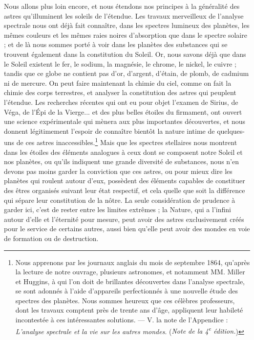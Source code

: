 \documentclass[a4paper, 11pt, oneside]{article}
\begin{document}
Nous allons plus loin encore, et nous étendons nos principes à la généralité des astres qu'illuminent les soleils de l'étendue. Les travaux merveilleux de l'analyse spectrale nous ont déjà fait connaître, dans les spectres lumineux des planètes, les mêmes couleurs et les mêmes raies noires d'absorption que dans le spectre solaire ; et de là nous sommes porté à voir dans les planètes des substances qui se trouvent également dans la constitution du Soleil. Or, nous savons déjà que dans le Soleil existent le fer, le sodium, la magnésie, le chrome, le nickel, le cuivre ; tandis que ce globe ne contient pas d'or, d'argent, d'étain, de plomb, de cadmium ni de mercure. On peut faire maintenant la chimie du ciel, comme on fait la chimie des corps terrestres, et analyser la constitution des astres qui peuplent l'étendue. Les recherches récentes qui ont eu pour objet l'examen de Sirius, de Véga, de l'Épi de la Vierge... et des plus belles étoiles du firmament, ont ouvert une science expérimentale qui mènera aux plus importantes découvertes, et nous donnent légitimement l'espoir de connaître bientôt la nature intime de quelques-uns de ces astres inaccessibles.\footnote{Nous apprenons par les journaux anglais du mois de septembre 1864, qu'après la lecture de notre ouvrage, plusieurs astronomes, et notamment MM. Miller et Huggins, à qui l'on doit de brillantes découvertes dans l'analyse spectrale, se sont adonnés à l'aide d'appareils perfectionnés à une nouvelle étude des spectres des planètes. Nous sommes heureux que ces célèbres professeurs, dont les travaux comptent près de trente ans d'âge, appliquent leur habileté incontestée à ces intéressantes solutions. --- V. la note de l'Appendice : \emph{L'analyse spectrale et la vie sur les autres mondes}. (\emph{Note de la 4\textsuperscript{e} édition.})} Mais que les spectres stellaires nous montrent dans les étoiles des éléments analogues à ceux dont se composent notre Soleil et nos planètes, ou qu'ils indiquent une grande diversité de substances, nous n'en devons pas moins garder la conviction que ces astres, ou pour mieux dire les planètes qui roulent autour d'eux, possèdent des éléments capables de constituer des êtres organisés suivant leur état respectif, et cela quelle que soit la différence qui sépare leur constitution de la nôtre. La seule considération de prudence à garder ici, c'est de rester entre les limites extrêmes ; la Nature, qui a l'infini autour d'elle et l'éternité pour mesure, peut avoir des astres exclusivement créés pour le service de certains autres, aussi bien qu'elle peut avoir des mondes en voie de formation ou de destruction.
\end{document}
